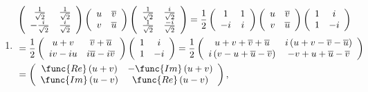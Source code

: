 \documentclass[aps,preprint]{revtex4}
\begin{document}
\begin{enumerate}
\item 
\begin{align}
& \left( 
\begin{array}{cc}
\frac{1}{\sqrt{2}} & \frac{1}{\sqrt{2}} \\ 
-\frac{i}{\sqrt{2}} & \frac{i}{\sqrt{2}}%
\end{array}%
\right) \left( 
\begin{array}{cc}
u & \overline{v} \\ 
v & \overline{u}%
\end{array}%
\right) \left( 
\begin{array}{cc}
\frac{1}{\sqrt{2}} & \frac{i}{\sqrt{2}} \\ 
\frac{1}{\sqrt{2}} & \frac{-i}{\sqrt{2}}%
\end{array}%
\right) =\frac{1}{2}\left( 
\begin{array}{cc}
1 & 1 \\ 
-i & i%
\end{array}%
\right) \left( 
\begin{array}{cc}
u & \overline{v} \\ 
v & \overline{u}%
\end{array}%
\right) \left( 
\begin{array}{cc}
1 & i \\ 
1 & -i%
\end{array}%
\right) \\
& =\frac{1}{2}\left( 
\begin{array}{cc}
u+v & \overline{v}+\overline{u} \\ 
iv-iu & i\overline{u}-i\overline{v}%
\end{array}%
\right) \left( 
\begin{array}{cc}
1 & i \\ 
1 & -i%
\end{array}%
\right) =\frac{1}{2}\left( 
\begin{array}{cc}
u+v+\overline{v}+\overline{u} & i\left( u+v-\overline{v}-\overline{u}\right)
\\ 
i\left( v-u+\overline{u}-\overline{v}\right) & -v+u+\overline{u}-\overline{v}%
\end{array}%
\right) \\
& =\left( 
\begin{array}{cc}
\func{Re}\left( u+v\right) & -\func{Im}\left( u+v\right) \\ 
\func{Im}\left( u-v\right) & \func{Re}\left( u-v\right)%
\end{array}%
\right) ,
\end{align}


\end{enumerate}
\end{document}
